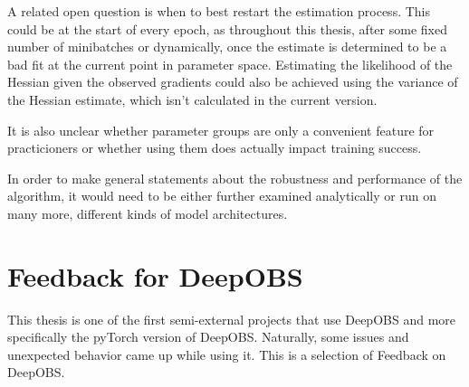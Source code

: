 \documentclass[twoside,12pt,a4paper]{report}
\begin{document}
A related open question is when to best restart the estimation process. This could be at the start of every epoch, as throughout this thesis, after some fixed number of minibatches or dynamically, once the estimate is determined to be a bad fit at the current point in parameter space. Estimating the likelihood of the Hessian given the observed gradients could also be achieved using the variance of the Hessian estimate, which isn't calculated in the current version.

It is also unclear whether parameter groups are only a convenient feature for practicioners or whether using them does actually impact training success.

In order to make general statements about the robustness and performance of the algorithm, it would need to be either further examined analytically or run on many more, different kinds of model architectures.

\section{Feedback for DeepOBS}
This thesis is one of the first semi-external projects that use DeepOBS and more specifically the pyTorch version of DeepOBS. Naturally, some issues and unexpected behavior came up while using it. This is a selection of Feedback on DeepOBS.
\end{document}
